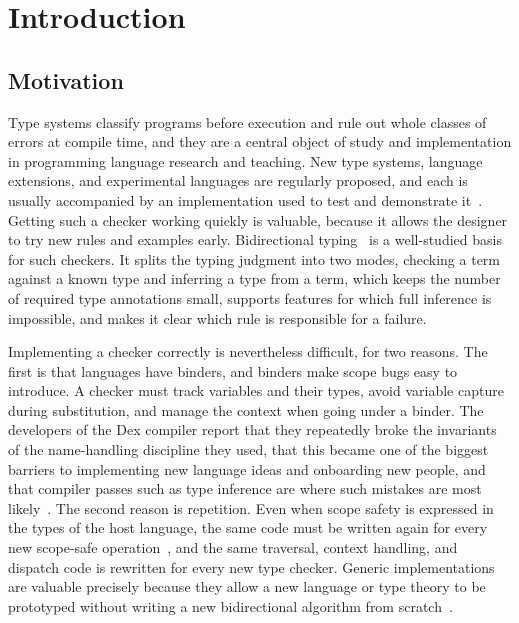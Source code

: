 \chapter{Introduction}
\label{chap:intro}

\section{Motivation}
\label{sec:intro-motivation}

Type systems classify programs before execution and rule out whole classes of errors at compile time, and they are a central object of study and implementation in programming language research and teaching. New type systems, language extensions, and experimental languages are regularly proposed, and each is usually accompanied by an implementation used to test and demonstrate it~\cite{felicissimo2023generic,abounegm2024stella}. Getting such a checker working quickly is valuable, because it allows the designer to try new rules and examples early. Bidirectional typing~\cite{dunfield2021bidirectional} is a well-studied basis for such checkers. It splits the typing judgment into two modes, checking a term against a known type and inferring a type from a term, which keeps the number of required type annotations small, supports features for which full inference is impossible, and makes it clear which rule is responsible for a failure.

Implementing a checker correctly is nevertheless difficult, for two reasons. The first is that languages have binders, and binders make scope bugs easy to introduce. A checker must track variables and their types, avoid variable capture during substitution, and manage the context when going under a binder. The developers of the Dex compiler report that they repeatedly broke the invariants of the name-handling discipline they used, that this became one of the biggest barriers to implementing new language ideas and onboarding new people, and that compiler passes such as type inference are where such mistakes are most likely~\cite{maclaurin2023foil}. The second reason is repetition. Even when scope safety is expressed in the types of the host language, the same code must be written again for every new scope-safe operation~\cite{allais2021universe}, and the same traversal, context handling, and dispatch code is rewritten for every new type checker. Generic implementations are valuable precisely because they allow a new language or type theory to be prototyped without writing a new bidirectional algorithm from scratch~\cite{felicissimo2023generic}.

